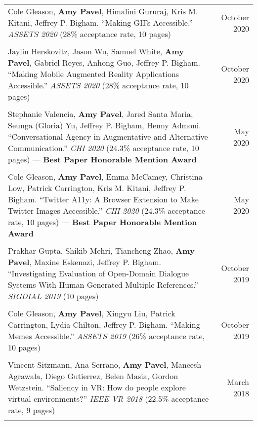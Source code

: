 \begin{longtable}{Xr}
	Cole Gleason, \textbf{Amy Pavel}, Himalini Gururaj, Kris M. Kitani, Jeffrey P. Bigham. ``Making GIFs Accessible.'' \textit{ASSETS 2020} (28\% acceptance rate, 10 pages) & October 2020 \\
	\\

	Jaylin Herskovitz, Jason Wu, Samuel White, \textbf{Amy Pavel}, Gabriel Reyes, Anhong Guo, Jeffrey P. Bigham. ``Making Mobile Augmented Reality Applications Accessible.'' \textit{ASSETS 2020} (28\% acceptance rate, 10 pages) & October 2020 \\
	\\

	Stephanie Valencia, \textbf{Amy Pavel}, Jared Santa Maria, Seunga (Gloria) Yu, Jeffrey P. Bigham, Henny Admoni. ``Conversational Agency in Augmentative and Alternative Communication.'' \textit{CHI 2020} (24.3\% acceptance rate, 10 pages) --- \textbf{Best Paper Honorable Mention Award} & May 2020 \\
	\\

	Cole Gleason, \textbf{Amy Pavel}, Emma McCamey, Christina Low, Patrick Carrington, Kris M. Kitani, Jeffrey P. Bigham. ``Twitter A11y: A Browser Extension to Make Twitter Images Accessible.'' \textit{CHI 2020} (24.3\% acceptance rate, 10 pages) --- \textbf{Best Paper Honorable Mention Award} & May 2020 \\
	\\

	Prakhar Gupta, Shikib Mehri, Tiancheng Zhao, \textbf{Amy Pavel}, Maxine Eskenazi, Jeffrey P. Bigham. ``Investigating Evaluation of Open-Domain Dialogue Systems With Human Generated Multiple References.'' \textit{SIGDIAL 2019} (10 pages) & October 2019 \\
	\\

	Cole Gleason, \textbf{Amy Pavel}, Xingyu Liu, Patrick Carrington, Lydia Chilton, Jeffrey P. Bigham. ``Making Memes Accessible.'' \textit{ASSETS 2019} (26\% acceptance rate, 10 pages) & October 2019 \\
	\\

	Vincent Sitzmann, Ana Serrano, \textbf{Amy Pavel}, Maneesh Agrawala, Diego Gutierrez, Belen Masia, Gordon Wetzstein. ``Saliency in VR: How do people explore virtual environments?'' \textit{IEEE VR 2018} (22.5\% acceptance rate, 9 pages) & March 2018 \\
	\\


\end{longtable}
